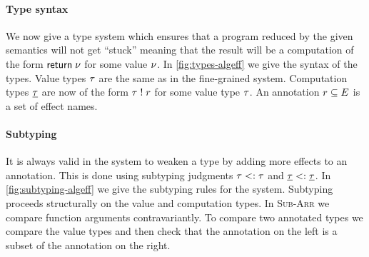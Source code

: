 {\begin{figure}
{\begin{minipage}{14 cm}
\label{fig:typing-algeff}
\end{minipage}
}
\end{figure}

\paragraph{Type syntax}
We now give a type system which ensures that a program reduced by the given semantics will not get ``stuck'' meaning that the result will be a computation of the form $\mathsf{return} \; \nu$ for some value $\nu$.
In \cref{fig:types-algeff} we give the syntax of the types.
Value types $\tau$ are the same as in the fine-grained system.
Computation types $\underline{\tau}$ are now of the form $\tau \; ! \; r$ for some value type $\tau$.
An annotation $r \subseteq E$ is a set of effect names.

\paragraph{Subtyping}
It is always valid in the system to weaken a type by adding more effects to an annotation.
This is done using subtyping judgments $\tau <: \tau$ and $\underline{\tau} <: \underline{\tau}$.
In \cref{fig:subtyping-algeff} we give the subtyping rules for the system.
Subtyping proceeds structurally on the value and computation types.
In \textsc{Sub-Arr} we compare function arguments contravariantly.
To compare two annotated types we compare the value types and then check that the annotation on the left is a subset of the annotation on the right.

}
